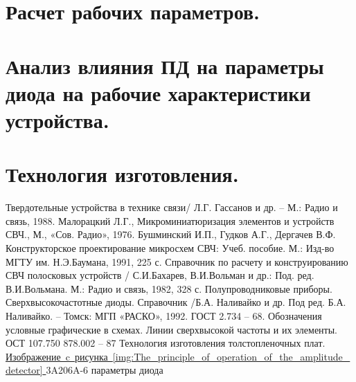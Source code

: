 \documentclass{bmstu}
\begin{document}
	\chapter{Расчет рабочих параметров.}
	
	\chapter{Анализ влияния ПД на параметры диода на рабочие характеристики устройства.}
	
	\chapter{Технология изготовления.} 
	
	
	\begin{thebibliography}{}
		 Твердотельные устройства в технике связи/ Л.Г. Гассанов и др. – М.: Радио и связь, 1988.
		 Малорацкий Л.Г., Микроминиатюризация элементов и устройств СВЧ., М., «Сов. Радио», 1976.
		 Бушминский И.П., Гудков А.Г., Дергачев В.Ф. Конструкторское проектирование микросхем СВЧ: Учеб. пособие. М.: Изд-во МГТУ им. Н.Э.Баумана, 1991, 225 с.
		 Справочник по расчету и конструированию СВЧ полосковых устройств / С.И.Бахарев, В.И.Вольман и др.: Под. ред. В.И.Вольмана. М.: Радио и связь, 1982, 328 с.
		 Полупроводниковые приборы. Сверхвысокочастотные диоды. Справочник /Б.А. Наливайко и др. Под ред. Б.А. Наливайко. – Томск: МГП «РАСКО», 1992.
		 ГОСТ 2.734 – 68. Обозначения условные графические в схемах. Линии сверхвысокой частоты и их элементы.
		 ОСТ 107.750 878.002 – 87   Технология изготовления толстопленочных плат.
		 \href{http://mart7157.narod.ru/voise_10.html}{
			Изображение~c~рисунка~\ref{img:The_principle_of_operation_of_the_amplitude_detector}
		}
		 3A206A-6 параметры диода
	\end{thebibliography}
	
	
\end{document}

